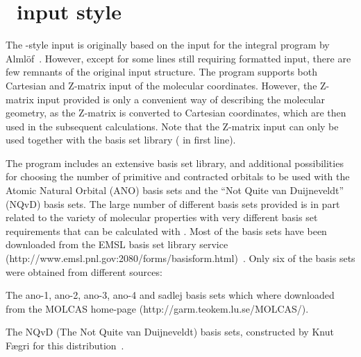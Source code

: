 \chapter{\mol\ input style}\label{ch:molinp}

The {\mol}-style input is originally based on the input for the {\mol}
integral program by Alml\"{o}f~\cite{moleculeref}. However, except for
some lines still requiring formatted input, there are few remnants of
the original input structure.
The program supports both Cartesian
and Z-matrix input of the
molecular coordinates. However, the Z-matrix input provided is only a
convenient way of describing the molecular geometry, as the Z-matrix is
converted to Cartesian coordinates, which are then used in the
subsequent calculations. Note that the Z-matrix input can only be
used together with the basis set library ( in first line).

The program includes an extensive basis set
library,  and
additional possibilities for choosing the number of primitive
and contracted orbitals to be used with the Atomic Natural Orbital
(ANO) basis sets
and the ``Not Quite van Duijneveldt'' (NQvD) basis
sets. The large number of
different basis sets provided is in part
related to the variety of molecular properties with very different
basis set requirements that can be calculated with \dalton .
Most of the basis sets have been downloaded from the EMSL basis set
library service\newline
(http://www.emsl.pnl.gov:2080/forms/basisform.html)~\cite{emslref}.
Only six of the basis sets were obtained from different sources:

\begin{list}{--}{}
\item The ano-1, ano-2, ano-3, ano-4 and sadlej basis sets which where
downloaded from the MOLCAS
home-page
(http://garm.teokem.lu.se/MOLCAS/).
\item The NQvD (The Not Quite van Duijneveldt) basis sets, constructed
by Knut F\ae gri for this distribution~\cite{nqvdref}.
\end{list}

